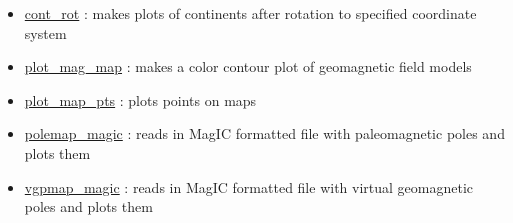 \documentclass[11pt]{book}
\begin{document}
{{\begin{itemize}
\item \href{https://pmagpy.github.io/PmagPy_plots_analysis.html#cont_rot}{cont\_rot} : makes plots of continents after rotation to specified coordinate system
\item \href{https://pmagpy.github.io/PmagPy_plots_analysis.html#plot_mag_map}{plot\_mag\_map} : makes a color contour plot of geomagnetic field models
\item \href{https://pmagpy.github.io/PmagPy_plots_analysis.html#plot_map_pts}{plot\_map\_pts} : plots points on maps
\item \href{https://pmagpy.github.io/PmagPy_plots_analysis.html#polemap_magic}{polemap\_magic} : reads in MagIC formatted file with paleomagnetic poles and plots them
\item \href{https://pmagpy.github.io/PmagPy_plots_analysis.html#vgpmap_magic}{vgpmap\_magic} : reads in MagIC formatted file with virtual geomagnetic poles and plots them

\end{itemize}

}}
\end{document}
